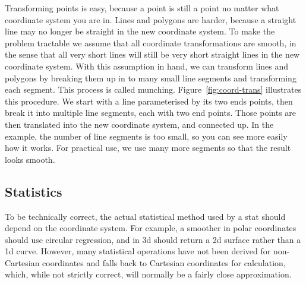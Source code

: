Transforming points is easy, because a point is still a point no matter what coordinate system you are in.  Lines and polygons are harder, because a straight line may no longer be straight in the new coordinate system.  To make the problem tractable we assume that all coordinate transformations are smooth, in the sense that all very short lines will still be very short straight lines in the new coordinate system.  With this assumption in hand, we can transform lines and polygons by breaking them up in to many small line segments and transforming each segment. This process is called munching.  Figure~\ref{fig:coord-trans} illustrates this procedure.  We start with a line parameterised by its two ends points, then break it into multiple line segments, each with two end points.  Those points are then translated into the new coordinate system, and connected up.  In the example, the number of line segments is too small, so you can see more easily how it works.  For practical use, we use many more segments so that the result looks smooth.

% 
%
% 


\subsection{Statistics}
\label{sub:statistics}

To be technically correct, the actual statistical method used by a stat should depend on the coordinate system.  For example, a smoother in polar coordinates should use circular regression, and in 3d should return a 2d surface rather than a 1d curve.  However, many statistical operations have not been derived for non-Cartesian coordinates and \ggplot falls back to Cartesian coordinates for calculation, which, while not strictly correct, will normally be a fairly close approximation.


